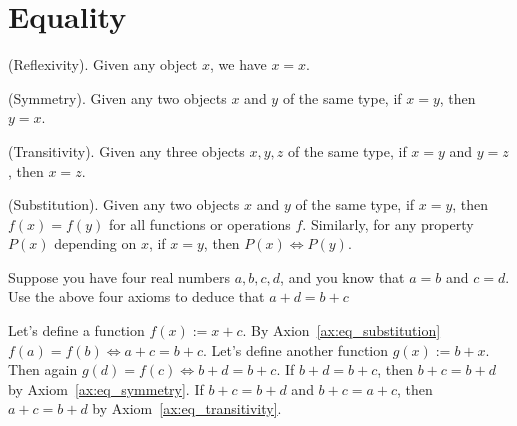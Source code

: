 \section{Equality}
\begin{axiom}
    \textup{(Reflexivity)}. Given any object $x$, we have $x=x$.
    \label{ax:eq_reflexivity}
\end{axiom}
\begin{axiom}
    \textup{(Symmetry)}. Given any two objects $x$ and $y$ of the 
    same type, if $x=y$, then $y=x$.
    \label{ax:eq_symmetry}
\end{axiom}
\begin{axiom}
    \textup{(Transitivity)}. Given any three objects $x, y, z$ of the same type, if $x=y$ and $y=z$, then $x=z$.
    \label{ax:eq_transitivity}
\end{axiom}
\begin{axiom}
    \textup{(Substitution)}. Given any two objects $x$ and $y$ of the same type, if $x=y$, then $f(x)=f(y)$ for all functions or operations $f$. Similarly, for any property $P(x)$ depending on $x$, if $x=y$, then $P(x) \Leftrightarrow P(y)$.
    \label{ax:eq_substitution}
\end{axiom}
\setcounter{exercise}{0}
\begin{exercise}
    Suppose you have four real numbers $a, b, c, d$, and you know that $a=b$ and $c=d$. Use the above four axioms to deduce that $a+d=b+c$
\end{exercise}
\begin{solution}
    Let's define a function $f(x):= x + c$. By Axion~\ref{ax:eq_substitution} $f(a) = f(b) \Leftrightarrow a+c = b + c$. Let's define another function $g(x):= b + x$. Then again $g(d) = f(c) \Leftrightarrow b+d = b + c$. If $b+d=b+c$, then $b+c=b+d$ by Axiom~\ref{ax:eq_symmetry}. If $b+c=b+d$ and $b+c= a+c$, then $a+c=b+d$ by Axiom~\ref{ax:eq_transitivity}.
\end{solution}

